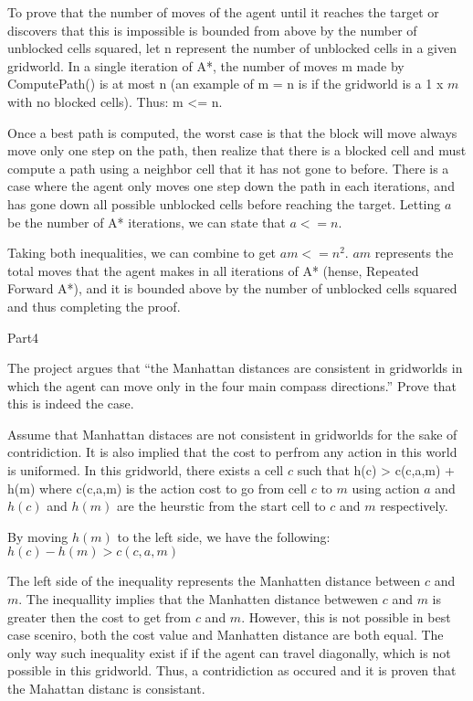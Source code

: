 \documentclass[12pt]{amsart}
\begin{document}
To prove that the number of moves of the agent until it reaches the target or discovers that this is impossible is
bounded from above by the number of unblocked cells squared, let n represent the number of unblocked cells in a given gridworld. In a single iteration of A*, the number of moves m made by ComputePath() is at most n (an example of m = n is if the gridworld is a 1 x $m$ with no blocked cells). Thus: m <= n.  

Once a best path is computed, the worst case is that the block will move always move only one step on the path, then realize that there is a blocked cell and must compute a path using a neighbor cell that it has not gone to before. There is a case where the agent only moves one step down the path in each iterations, and has gone down all possible unblocked cells before reaching the target. Letting $a$ be the number of A* iterations, we can state that $a <= n$.

Taking both inequalities, we can combine to get $am <= n^2$. $am$ represents the total moves that the agent makes in all iterations of A* (hense, Repeated Forward A*), and it is bounded above by the number of unblocked cells squared and thus completing the proof. 

\medskip\noindent Part4

The project argues that “the Manhattan distances are consistent in
gridworlds in which the agent can move only in the four main compass directions.” Prove that this is indeed the case.

Assume that Manhattan distaces are not consistent in gridworlds for the sake of contridiction. It is also implied that the cost to perfrom any action in this world is uniformed. In this gridworld, there exists a cell $c$ such that
h(c) > c(c,a,m) + h(m) 
where c(c,a,m) is the action cost to go from cell $c$ to $m$ using action $a$ and $h(c)$ and $h(m)$ are the heurstic from the start cell to $c$ and $m$ respectively.	

By moving $h(m)$ to the left side, we have the following:
$h(c) - h(m) > c(c,a,m)$

The left side of the inequality represents the Manhatten distance between $c$ and $m$. The inequallity implies that the Manhatten distance betwewen $c$ and $m$ is greater then the cost to get from $c$ and $m$. However, this is not possible in best case sceniro, both the cost value and Manhatten distance are both equal. The only way such inequality exist if if the agent can travel diagonally, which is not possible in this gridworld. Thus, a contridiction as occured and it is proven that the Mahattan distanc is consistant.

  
\end{document}
